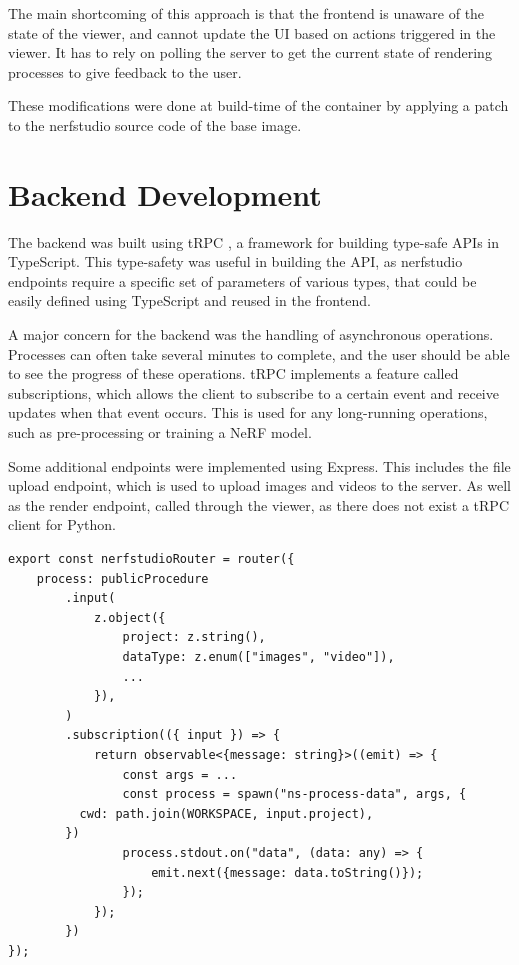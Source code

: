 The main shortcoming of this approach is that the frontend is unaware of the state of the viewer, and cannot update the UI based on actions triggered in the viewer.
It has to rely on polling the server to get the current state of rendering processes to give feedback to the user.

These modifications were done at build-time of the container by applying a patch to the nerfstudio source code of the base image.

\section{Backend Development}
\label{sec:system:backend}


The backend was built using tRPC \cite{noauthor_trpc_nodate}, a framework for building type-safe APIs in TypeScript.
This type-safety was useful in building the API, as nerfstudio endpoints require a specific set of parameters of various types, that could be easily defined using TypeScript and reused in the frontend.

A major concern for the backend was the handling of asynchronous operations.
Processes can often take several minutes to complete, and the user should be able to see the progress of these operations.
tRPC implements a feature called subscriptions, which allows the client to subscribe to a certain event and receive updates when that event occurs.
This is used for any long-running operations, such as pre-processing or training a NeRF model.

Some additional endpoints were implemented using Express.
This includes the file upload endpoint, which is used to upload images and videos to the server.
As well as the render endpoint, called through the viewer, as there does not exist a tRPC client for Python.

\begin{lstlisting}[style=ES6, caption=Example tRPC endpoint for Pre-Processing]
export const nerfstudioRouter = router({
	process: publicProcedure
		.input(
			z.object({
				project: z.string(),
				dataType: z.enum(["images", "video"]),
				...
			}),
		)
		.subscription(({ input }) => {
			return observable<{message: string}>((emit) => {
				const args = ...
				const process = spawn("ns-process-data", args, {
          cwd: path.join(WORKSPACE, input.project),
        })
				process.stdout.on("data", (data: any) => {
					emit.next({message: data.toString()});
				});
			});
		})
});
\end{lstlisting}

